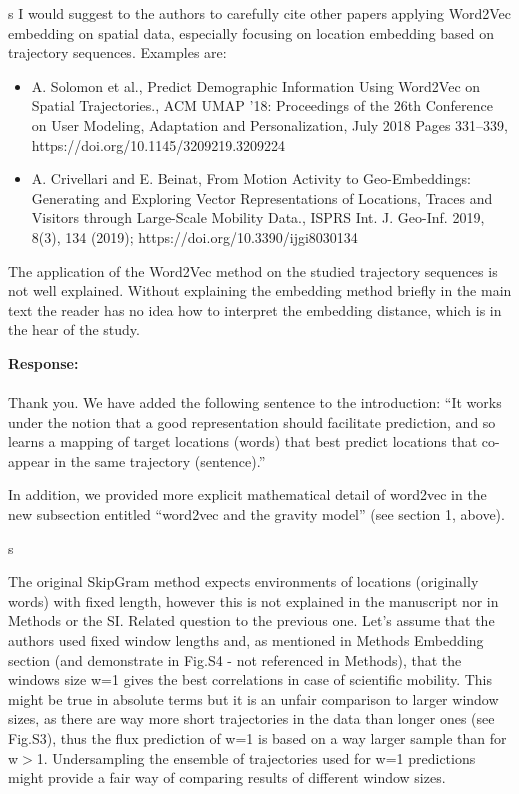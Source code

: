\documentclass[12pt,a4paper]{article}
\newcommand{\response}[1]{{\noindent \textbf{Response:} \\ \\ \noindent #1}}
\newcommand{\rcomment}[1]{%
\vspace{10pt}
\begin{sectionbox}
s #1
\end{sectionbox}
}
\begin{document}
\rcomment{
	I would suggest to the authors to carefully cite other papers applying Word2Vec embedding on spatial data, especially focusing on location embedding based on trajectory sequences. Examples are:
	\begin{itemize}
		\item A. Solomon et al., Predict Demographic Information Using Word2Vec on Spatial Trajectories., ACM UMAP '18: Proceedings of the 26th Conference on User Modeling, Adaptation and Personalization, July 2018 Pages 331–339, https://doi.org/10.1145/3209219.3209224
		\item A. Crivellari and E. Beinat, From Motion Activity to Geo-Embeddings: Generating and Exploring Vector Representations of Locations, Traces and Visitors through Large-Scale Mobility Data., ISPRS Int. J. Geo-Inf. 2019, 8(3), 134 (2019); https://doi.org/10.3390/ijgi8030134

	\end{itemize}

	The application of the Word2Vec method on the studied trajectory sequences is not well explained. Without explaining the embedding method briefly in the main text the reader has no idea how to interpret the embedding distance, which is in the hear of the study.

}

\response{Thank you.
We have added the following sentence to the introduction: “It works under the notion that a good representation should facilitate prediction, and so learns a mapping of target locations (words) that best predict locations that co-appear in the same trajectory (sentence).”

	In addition, we provided more explicit mathematical detail of word2vec in the new subsection entitled “word2vec and the gravity model” (see section 1, above).

}

\rcomment{

	The original SkipGram method expects environments of locations (originally words) with fixed length, however this is not explained in the manuscript nor in Methods or the SI.
	Related question to the previous one. Let’s assume that the authors used fixed window lengths and, as mentioned in Methods Embedding section (and demonstrate in Fig.S4 - not referenced in Methods), that the windows size w=1 gives the best correlations in case of scientific mobility. This might be true in absolute terms but it is an unfair comparison to larger window sizes, as there are way more short trajectories in the data than longer ones (see Fig.S3), thus the flux prediction of w=1 is based on a way larger sample than for w$>$1. Undersampling the ensemble of trajectories used for w=1 predictions might provide a fair way of comparing results of different window sizes.
}
\end{document}
